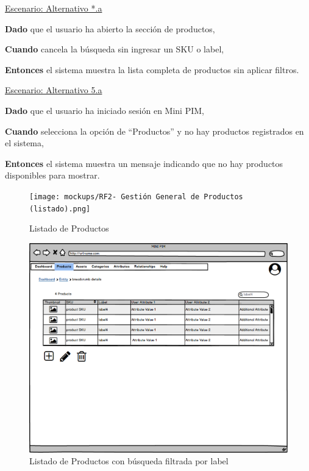 \underline{Escenario: Alternativo *.a}\par
\vspace{0.15cm}
\textbf{Dado} que el usuario ha abierto la sección de productos,\par
\textbf{Cuando} cancela la búsqueda sin ingresar un SKU o label,\par
\textbf{Entonces} el sistema muestra la lista completa de productos sin aplicar filtros.\par
\vspace{0.20cm}

\underline{Escenario: Alternativo 5.a}\par
\vspace{0.15cm}
\textbf{Dado} que el usuario ha iniciado sesión en Mini PIM,\par
\textbf{Cuando} selecciona la opción de \enquote{Productos} y no hay productos registrados en el sistema,\par
\textbf{Entonces} el sistema muestra un mensaje indicando que no hay productos disponibles para mostrar.\par
\vspace{0.20cm}


\begin{figure}[H]
    \texttt{[image: mockups/RF2- Gestión General de Productos (listado).png]}
    \caption{Listado de Productos}
   \end{figure}
\vspace{1.0cm}

\begin{figure}[H]
    \includegraphics[width=1\linewidth]{mockups/RF2- Gestión General de Productos (listado por búsqueda).png}
    \caption{Listado de Productos con búsqueda filtrada por label}
   \end{figure}
\vspace{1.0cm}

\newpage %